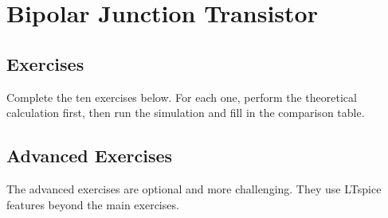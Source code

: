 \chapter{Bipolar Junction Transistor}




\clearpage
\section{Exercises}
Complete the ten exercises below. For each one, perform the theoretical calculation first,
then run the simulation and fill in the comparison table.












\clearpage
\section{Advanced Exercises}
The advanced exercises are optional and more challenging. They use LTspice features beyond the main exercises.





